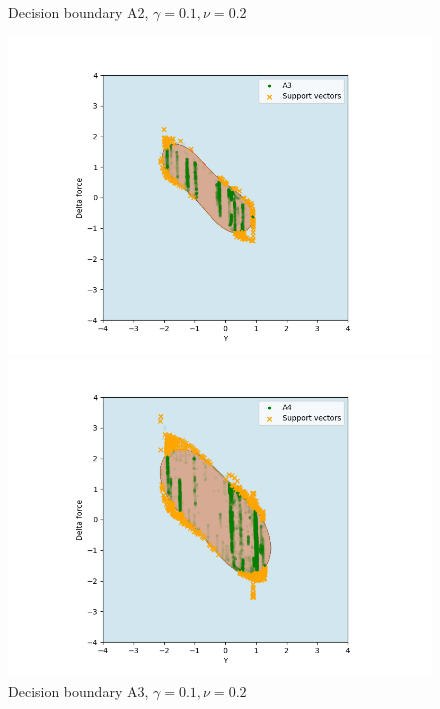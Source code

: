 \begin{figure}[]
\begin{minipage}[b]{0.5\linewidth}
                    \caption*{Decision boundary A2, $\gamma = 0.1, \nu = 0.2$}
                \end{minipage}
                \hfill
                \begin{minipage}[b]{0.5\linewidth}
                    \centering
                    \includegraphics[width = \textwidth]{figures/analysis/oneclass_servo/SVM_one_class_A3_startup_nu_01_gamma_02.png}
                    \caption*{Decision boundary A3, $\gamma = 0.1, \nu = 0.2$}
                \end{minipage}
                \hfill
                \begin{minipage}[b]{0.5\linewidth}
                    \centering
                    \includegraphics[width = \textwidth]{figures/analysis/oneclass_servo/SVM_one_class_A4_startup_nu_01_gamma_02.png}

\end{minipage}
\end{figure}
